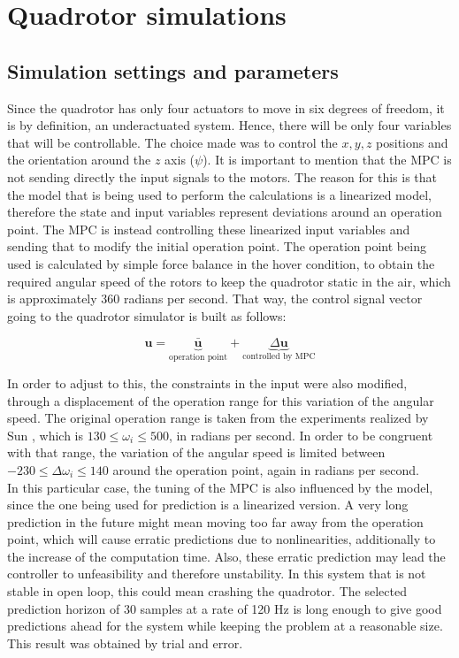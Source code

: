\section{Quadrotor simulations}

\subsection{Simulation settings and parameters}

Since the quadrotor has only four actuators to move in six degrees of freedom, it is by definition, an underactuated system. Hence, there will be only four variables that will be controllable. The choice made was to control the $x, y, z$ positions and the orientation around the $z$ axis ($\psi$). It is important to mention that the MPC is not sending directly the input signals to the motors. The reason for this is that the model that is being used to perform the calculations is a linearized model, therefore the state and input variables represent deviations around an operation point. The MPC is instead controlling these linearized input variables and sending that to modify the initial operation point. The operation point being used is calculated by simple force balance in the hover condition, to obtain the required angular speed of the rotors to keep the quadrotor static in the air, which is approximately $360$ radians per second. That way, the control signal vector going to the quadrotor simulator is built as follows:

\begin{equation*}
\mathbf{u} = \underbrace{\mathbf{\bar{u}}}_\textrm{operation point} + \underbrace{\Delta \mathbf{u}}_\textrm{controlled by MPC}
\end{equation*}

In order to adjust to this, the constraints in the input were also modified, through a displacement of the operation range for this variation of the angular speed. The original operation range is taken from the experiments realized by Sun \cite{YueSun2012}, which is $130 \leq \omega_{i} \leq 500$, in radians per second. In order to be congruent with that range, the variation of the angular speed is limited between $-230 \leq \Delta \omega_{i} \leq 140$ around the operation point, again in radians per second.\\ 

In this particular case, the tuning of the MPC is also influenced by the model, since the one being used for prediction is a linearized version. A very long prediction in the future might mean moving too far away from the operation point, which will cause erratic predictions due to nonlinearities, additionally to the increase of the computation time. Also, these erratic prediction may lead the controller to unfeasibility and therefore unstability. In this system that is not stable in open loop, this could mean crashing the quadrotor. The selected prediction horizon of 30 samples at a rate of 120 Hz is long enough to give good predictions ahead for the system while keeping the problem at a reasonable size. This  result was obtained by trial and error.\\

